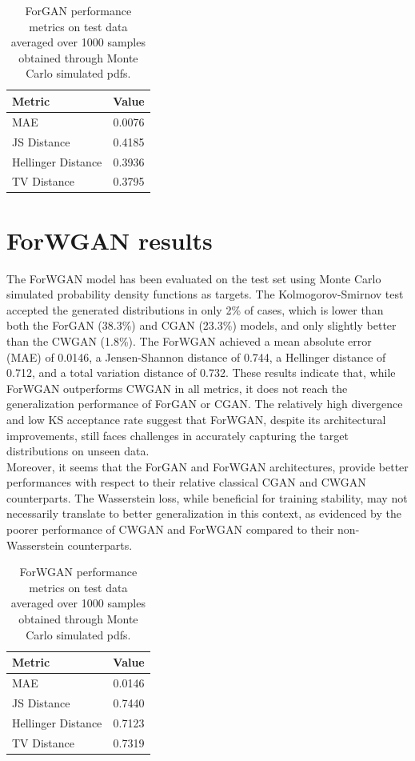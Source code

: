 \begin{table}[h]
\centering
\begin{tabular}{l c}
\hline
\textbf{Metric} & \textbf{Value} \\
\hline
MAE & 0.0076 \\
JS Distance & 0.4185 \\
Hellinger Distance & 0.3936 \\
TV Distance & 0.3795 \\
\hline
\end{tabular}
\caption{ForGAN performance metrics on test data averaged over 1000 samples obtained through Monte Carlo simulated pdfs.}
\end{table}

\section{ForWGAN results}

The ForWGAN model has been 
evaluated on the test set using Monte Carlo 
simulated probability density functions as targets.
The Kolmogorov-Smirnov test accepted 
the generated distributions in only 2\% of cases, 
which is lower than both the ForGAN (38.3\%) and CGAN (23.3\%) models,
and only slightly better than the CWGAN (1.8\%). 
The ForWGAN achieved a mean absolute error (MAE) 
of 0.0146, a Jensen-Shannon distance of 0.744, 
a Hellinger distance of 0.712, 
and a total variation distance of 0.732.
These results indicate that, while ForWGAN outperforms 
CWGAN in all metrics, 
it does not reach the generalization performance of ForGAN or CGAN.
The relatively high divergence and low KS acceptance rate suggest that ForWGAN,
despite its architectural improvements,
still faces challenges in accurately capturing 
the target distributions on unseen data.\\
Moreover, it seems that the ForGAN and ForWGAN architectures, provide better performances 
with respect to their relative classical CGAN and CWGAN counterparts. 
The Wasserstein loss, while beneficial for training stability, may not necessarily translate to better generalization in this context, 
as evidenced by the poorer performance of CWGAN and ForWGAN compared to their non-Wasserstein counterparts.

\begin{table}[h]
\centering
\begin{tabular}{l c}
\hline
\textbf{Metric} & \textbf{Value} \\
\hline
MAE & 0.0146 \\
JS Distance & 0.7440 \\
Hellinger Distance & 0.7123 \\
TV Distance & 0.7319 \\
\hline
\end{tabular}
\caption{ForWGAN performance metrics on test data averaged over 1000 samples obtained through Monte Carlo simulated pdfs.}
\end{table}





